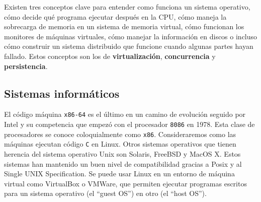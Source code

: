
Existen tres conceptos clave para entender como funciona un sistema operativo, cómo decide qué programa ejecutar después en la CPU, cómo maneja la sobrecarga de memoria en un sistema de memoria virtual, cómo funcionan los monitores de máquinas virtuales, cómo manejar la información en discos o incluso cómo construir un sistema distribuido que funcione cuando algunas partes hayan fallado. Estos conceptos son los de \textbf{virtualización}, \textbf{concurrencia} y \textbf{persistencia}.

\subsection{Sistemas informáticos}

El código máquina \texttt{x86-64} es el último en un camino de evolución seguido por Intel y su competencia que empezó con el procesador \texttt{8086} en 1978. Esta clase de procesadores se conoce coloquialmente como \texttt{x86}. Consideraremos como las máquinas ejecutan código \texttt{C} en Linux. Otros sistemas operativos que tienen herencia del sistema operativo Unix son Solaris, FreeBSD y MacOS X. Estos sistemas han mantenido un buen nivel de compatibilidad gracias a Posix y al Single UNIX Specification. Se puede usar Linux en un entorno de máquina virtual como VirtualBox o VMWare, que permiten ejecutar programas escritos para un sistema operativo (el ``guest OS'') en otro (el ``host OS'').
